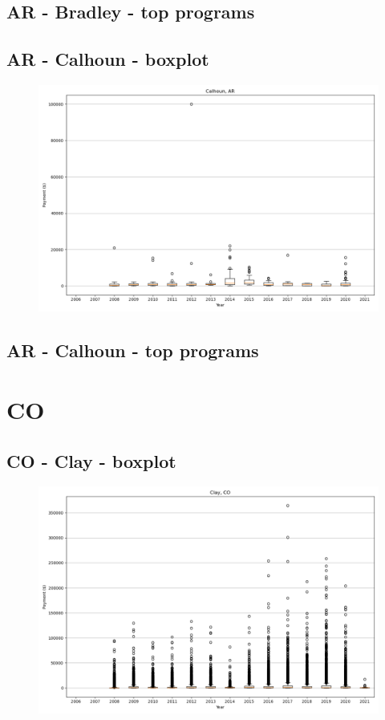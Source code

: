 \subsection*{AR - Bradley - top programs}

\newpage
\subsection*{AR - Calhoun - boxplot}
\begin{figure}[h]
\centering
\includegraphics[width=7in]{../output/boxplots/counties/Calhoun-AR_boxplot.png}
\end{figure}


\subsection*{AR - Calhoun - top programs}

\newpage
\section*{CO}
\subsection*{CO - Clay - boxplot}
\begin{figure}[h]
\centering
\includegraphics[width=7in]{../output/boxplots/counties/Clay-CO_boxplot.png}
\end{figure}


